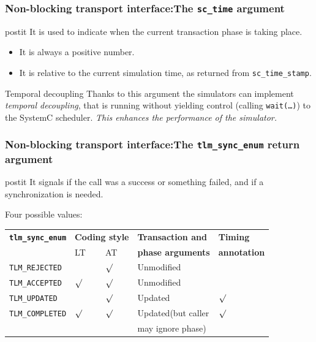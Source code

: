 {\begin{frame}
	\frametitle{Non-blocking transport interface:\newline The \texttt{sc\_time} argument}
	\begin{beamercolorbox}[center,rounded=true,wd=\textwidth]{postit}
		It is used to indicate when the current transaction phase is taking place.
	\end{beamercolorbox}
	\begin{itemize}
		\item<1-> It is always a positive number.
		\item<1-> It is relative to the current simulation time, as returned from \texttt{sc\_time\_stamp}.
	\end{itemize}
	\begin{block}{Temporal decoupling}
		Thanks to this argument the simulators can implement \emph{temporal decoupling}, that is running without yielding control (calling \texttt{wait(\ldots)}) to the SystemC scheduler.
		\newline \newline
		\emph{This enhances the performance of the simulator.}
	\end{block}
\end{frame}

\begin{frame}
	\frametitle{Non-blocking transport interface:\newline The \texttt{tlm\_sync\_enum} return argument}
	\begin{beamercolorbox}[center,rounded=true,wd=\textwidth]{postit}
		It signals if the call was a success or something failed, and if a synchronization is needed.
	\end{beamercolorbox}
	Four possible values:
	{\footnotesize
	\newcommand{\X}{\textbf{\color{MyDarkGreen}$\surd$}}
	\newline
	\begin{tabular}{|l|p{2.5em}|p{2.5em}|l|l|}
		\hline
		\texttt{\textbf{tlm\_sync\_enum}} & \multicolumn{2}{l|}{\textbf{Coding style}} & \textbf{Transaction and} & \textbf{Timing} \\
		\cline{2-3}
		& {\protect \centering LT} & {\protect \centering AT} & \textbf{phase arguments} & \textbf{annotation} \\
		\hline
		\texttt{TLM\_REJECTED} & & \X & Unmodified &  \\
		\hline
		\texttt{TLM\_ACCEPTED} & \X & \X & Unmodified &  \\
		\hline
		\texttt{TLM\_UPDATED} & & \X & Updated & \X \\
		\hline
		\texttt{TLM\_COMPLETED} & \X & \X & Updated\tiny{(but caller} & \X \\
		& & & \tiny{may ignore phase)} & \\
		\hline
	\end{tabular}
	}
\end{frame}
}

